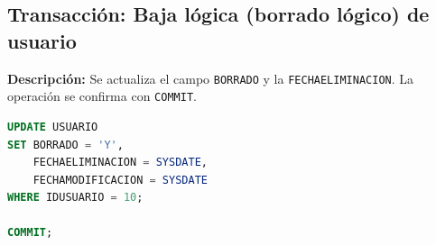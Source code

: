 \subsection{Transacción: Baja lógica (borrado lógico) de usuario}

\textbf{Descripción:} Se actualiza el campo \texttt{BORRADO} y la \texttt{FECHAELIMINACION}. La operación se confirma con \texttt{COMMIT}.

\begin{lstlisting}[language=SQL, caption={Transacción de baja lógica de usuario}]
UPDATE USUARIO
SET BORRADO = 'Y',
    FECHAELIMINACION = SYSDATE,
    FECHAMODIFICACION = SYSDATE
WHERE IDUSUARIO = 10;

COMMIT;
\end{lstlisting}
